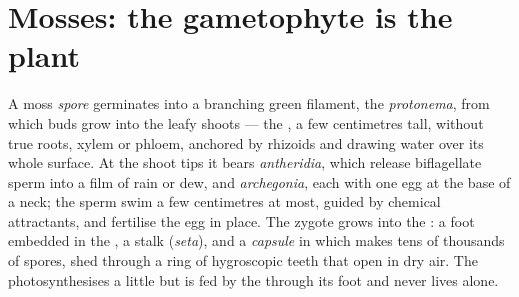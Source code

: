 \section{Mosses: the gametophyte is the plant}

\begin{definition}\label{def:b2:plant-life-cycles:moss}
A moss \emph{spore} germinates into a branching green filament, the
\emph{protonema}, from which buds grow into the leafy shoots --- the
\emph{}, a few centimetres tall, without true roots,
xylem or phloem, anchored by rhizoids and drawing water over its
whole surface. At the shoot tips it bears \emph{antheridia}, which
release biflagellate sperm into a film of rain or dew, and
\emph{archegonia}, each with one egg at the base of a neck; the
sperm swim a few centimetres at most, guided by chemical attractants,
and fertilise the egg in place. The zygote grows into the
\emph{}: a foot embedded in the , a stalk
(\emph{seta}), and a \emph{capsule} in which  makes tens of
thousands of spores, shed through a ring of hygroscopic teeth that
open in dry air. The  photosynthesises a little but is fed
by the  through its foot and never lives alone.
\end{definition}

